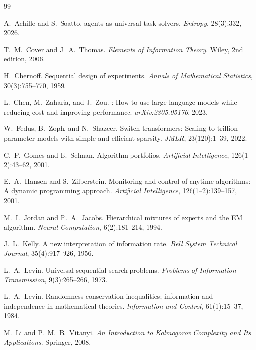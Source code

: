 \documentclass[10pt,twocolumn]{article}
\theoremstyle{paperplain}
\theoremstyle{paperdefinition}
\theoremstyle{paperremark}
\begin{document}
\begin{thebibliography}{99}

A.~Achille and S.~Soatto.
 agents as universal task solvers.
\newblock \emph{Entropy}, 28(3):332, 2026.

T.~M.~Cover and J.~A.~Thomas.
\newblock \emph{Elements of Information Theory}.
\newblock Wiley, 2nd edition, 2006.

H.~Chernoff.
\newblock Sequential design of experiments.
\newblock \emph{Annals of Mathematical Statistics}, 30(3):755--770, 1959.

L.~Chen, M.~Zaharia, and J.~Zou.
: How to use large language models while reducing cost and improving performance.
\newblock \emph{arXiv:2305.05176}, 2023.

W.~Fedus, B.~Zoph, and N.~Shazeer.
\newblock Switch transformers: Scaling to trillion parameter models with simple and efficient sparsity.
\newblock \emph{JMLR}, 23(120):1--39, 2022.

C.~P.~Gomes and B.~Selman.
\newblock Algorithm portfolios.
\newblock \emph{Artificial Intelligence}, 126(1--2):43--62, 2001.

E.~A.~Hansen and S.~Zilberstein.
\newblock Monitoring and control of anytime algorithms: A dynamic programming approach.
\newblock \emph{Artificial Intelligence}, 126(1--2):139--157, 2001.

M.~I.~Jordan and R.~A.~Jacobs.
\newblock Hierarchical mixtures of experts and the EM algorithm.
\newblock \emph{Neural Computation}, 6(2):181--214, 1994.

J.~L.~Kelly.
\newblock A new interpretation of information rate.
\newblock \emph{Bell System Technical Journal}, 35(4):917--926, 1956.

L.~A.~Levin.
\newblock Universal sequential search problems.
\newblock \emph{Problems of Information Transmission}, 9(3):265--266, 1973.

L.~A.~Levin.
\newblock Randomness conservation inequalities; information and independence in mathematical theories.
\newblock \emph{Information and Control}, 61(1):15--37, 1984.

M.~Li and P.~M.~B.~Vitanyi.
\newblock \emph{An Introduction to Kolmogorov Complexity and Its Applications}.
\newblock Springer, 2008.


\end{thebibliography}
\end{document}
